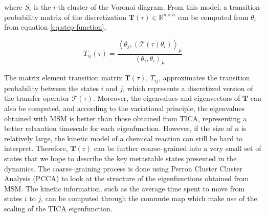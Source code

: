 \begin{spacing}{2.0}
    \noindent where $S_i$ is the $i$-th cluster of the Voronoi diagram. From this model, a transition probability matrix of the discretization
    $\mathbf{T}(\tau) \in \mathbb{R}^{n\times n}$ can be computed from $\theta_i$ from equation \ref{eq:step-function},

    \begin{equation}
        T_{ij}(\tau) = \frac{\left<\theta_j,\left(\mathcal{T}(\tau)\theta_i\right)\right>_{\mu}}{\left<\theta_i,\theta_i\right>_{\mu}}
    \end{equation}

    The matrix element transition matrix $\mathbf{T}(\tau)$, $T_{ij}$, approximates the transition probability between the states $i$ and $j$, which
    represents a discretized version of the transfer operator $\mathcal{T}(\tau)$. Moreover, the eigenvalues and eigenvectors of $\mathbf{T}$ can
    also be computed, and according to the variational principle, the eigenvalues obtained with MSM is better than those obtained from TICA, representing
    a better relaxation timescale for each eigenfunction. \cite{P-SIAMMultModSim-2013-v11-Noe,P-JChemPhys-2013-v139-Perez-Hernandez}
    However, if the size of $n$ is relatively large, the kinetic 
    model of a chemical reaction can still be hard to interpret. Therefore, $\mathbf{T}(\tau)$ can be further coarse--grained into a very small
    set of states that we hope to describe the key metastable states presented in the dynamics. The coarse--graining process is done using 
    Perron Cluster Cluster Analysis (PCCA) \cite{P-JChemPhys-2007-v126-Noe} to look at the structure of the eigenfunctions obtained from MSM.
    The kinetic information, such as the average time spent to move from states $i$ to $j$, can be computed through the commute map which make use of
    the scaling of the TICA eigenfunction. \cite{P-JCTC-2016-v12-Noe}
\end{spacing}
